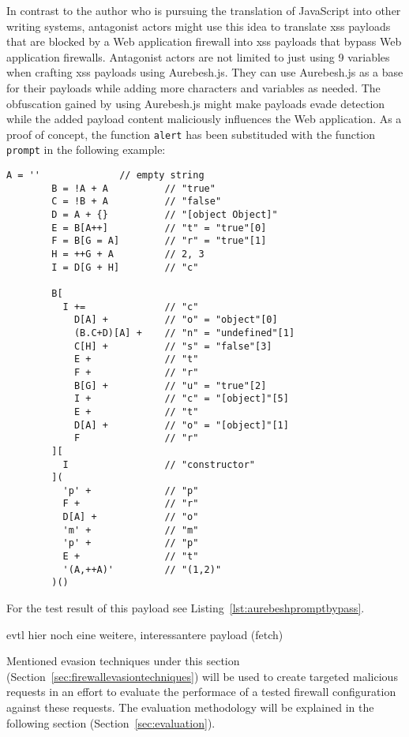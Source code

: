 In contrast to the author who is pursuing the translation of JavaScript into other writing systems, antagonist actors might use this idea to translate \gls{xss} payloads that are blocked by a Web application firewall into \gls{xss} payloads that bypass Web application firewalls. Antagonist actors are not limited to just using 9 variables when crafting \gls{xss} payloads using Aurebesh.js. They can use Aurebesh.js as a base for their payloads while adding more characters and variables as needed.
The obfuscation gained by using Aurebesh.js might make payloads evade detection while the added payload content maliciously influences the Web application.
As a proof of concept, the function \verb|alert| has been substituded with the function \verb|prompt| in the following example:

\begin{lstlisting}[style=basicStyle, caption=Aurebesh.js obfuscation of prompt, label={lst:aurebeshprompt}]
		A = ''              // empty string
		B = !A + A          // "true"
		C = !B + A          // "false"
		D = A + {}          // "[object Object]"
		E = B[A++]          // "t" = "true"[0]
		F = B[G = A]        // "r" = "true"[1]
		H = ++G + A         // 2, 3
		I = D[G + H]        // "c"

		B[
		  I +=              // "c"
		    D[A] +          // "o" = "object"[0]
		    (B.C+D)[A] +    // "n" = "undefined"[1]
		    C[H] +          // "s" = "false"[3]
		    E +             // "t"
		    F +             // "r"
		    B[G] +          // "u" = "true"[2]
		    I +             // "c" = "[object]"[5]
		    E +             // "t"
		    D[A] +          // "o" = "[object]"[1]
		    F               // "r"
		][
		  I                 // "constructor"
		](
		  'p' +             // "p"
		  F +               // "r"
		  D[A] +            // "o"
		  'm' +             // "m"
		  'p' +             // "p"
		  E +               // "t"
		  '(A,++A)'         // "(1,2)"
		)()
\end{lstlisting}

For the test result of this payload see Listing~\ref{lst:aurebeshpromptbypass}.

{\color{red} evtl hier noch eine weitere, interessantere payload (fetch)}


Mentioned evasion techniques under this section (Section~\ref{sec:firewallevasiontechniques}) will be used to create targeted malicious requests in an effort to evaluate the performace of a tested firewall configuration against these requests. The evaluation methodology will be explained in the following section (Section~\ref{sec:evaluation}).

